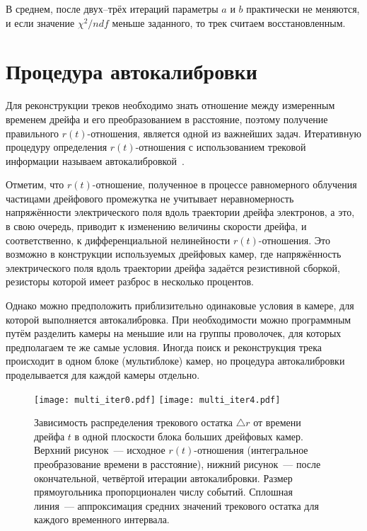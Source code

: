 В среднем, после двух--трёх итераций параметры $a$ и $b$ практически не
меняются, и если значение $\chi^2/ndf$ меньше заданного, то трек считаем
восстановленным.

\section{Процедура автокалибровки}
Для реконструкции треков необходимо знать отношение между измеренным временем
дрейфа и его преобразованием в расстояние, поэтому получение правильного
$r(t)$-отношения, является одной из важнейших задач. Итеративную процедуру
определения $r(t)$-отношения с использованием трековой информации называем
автокалибровкой~\cite{bac97,pet05,ame04}.

Отметим, что $r(t)$-отношение, полученное в процессе равномерного облучения
частицами дрейфового промежутка не учитывает неравномерность напряжённости
электрического поля вдоль траектории дрейфа электронов, а это, в свою очередь,
приводит к изменению величины скорости дрейфа, и соответственно, к
дифференциальной нелинейности $r(t)$-отношения. Это возможно в конструкции
используемых дрейфовых камер, где напряжённость электрического поля вдоль
траектории дрейфа задаётся резистивной сборкой, резисторы которой имеет разброс
в несколько процентов.

Однако можно предположить приблизительно одинаковые условия в камере, для
которой выполняется автокалибровка. При необходимости можно программным путём
разделить камеры на меньшие или на группы проволочек, для которых предполагаем
те же самые условия. Иногда поиск и реконструкция трека происходит в одном
блоке (мультиблоке) камер, но процедура автокалибровки проделывается для
каждой камеры отдельно.

\begin{figure}[!h]
  \centering
  \texttt{[image: multi\_iter0.pdf]}
  \texttt{[image: multi\_iter4.pdf]}
  \caption{Зависимость распределения трекового остатка $\triangle r$ от времени
    дрейфа $t$ в одной плоскости блока больших дрейфовых камер. Верхний
    рисунок~--- исходное $r(t)$-отношения (интегральное преобразование времени
    в расстояние), нижний рисунок~--- после окончательной, четвёртой итерации
    автокалибровки. Размер прямоугольника пропорционален числу событий. Сплошная
    линия~--- аппроксимация средних значений трекового остатка для каждого
    временного интервала.}
  \label{fig:multi_iter}
\end{figure}

